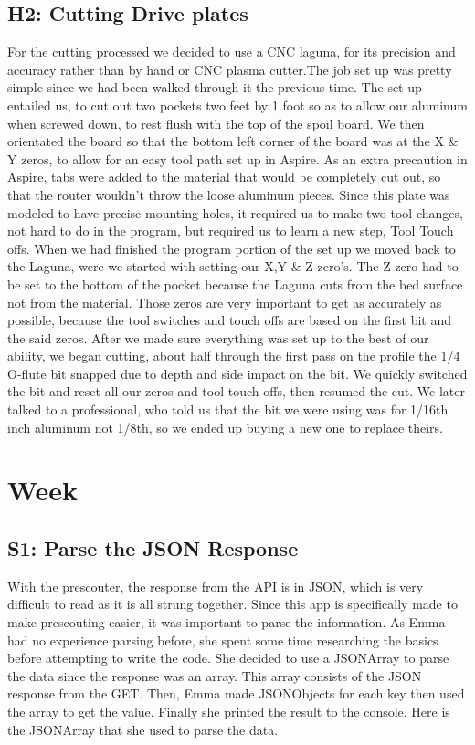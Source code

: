 \documentclass{article}
\begin{document}
\subsection{H2: Cutting Drive plates}

For the cutting processed we decided to use a CNC laguna, for its precision and accuracy rather than by hand or CNC plasma cutter.The job set up was pretty simple since we had been walked through it the previous time. The set up entailed us, to cut out two pockets two feet by 1 foot so as to allow our aluminum when screwed down, to rest flush with the top of the spoil board. We then orientated the board so that the bottom left corner of the board was at the X \& Y zeros, to allow for an easy tool path set up in Aspire. As an extra precaution in Aspire, tabs were added to the material that would be completely cut out, so that the router wouldn't throw the loose aluminum pieces. Since this plate was modeled to have precise mounting holes, it required us to make two tool changes, not hard to do in the program, but required us to learn a new step, Tool Touch offs. When we had finished the program portion of the set up we moved back to the Laguna, were we started with setting our X,Y \& Z zero's. The Z zero had to be set to the bottom of the pocket because the Laguna cuts from the bed surface not from the material. Those zeros are very important to get as accurately as possible, because the tool switches and touch offs are based on the first bit and the said zeros. After we made sure everything was set up to the best of our ability, we began cutting, about half through the first pass on the profile the 1/4 O-flute bit snapped due to depth and side impact on the bit. We quickly switched the bit and reset all our zeros and tool touch offs, then resumed the cut. We later talked to a professional, who told us that the bit we were using was for 1/16th inch aluminum not 1/8th, so we ended up buying a new one to replace theirs.  

\clearpage \newpage \section{Week \thesection} 
\subsection{S1: Parse the JSON Response}

With the prescouter, the response from the API is in JSON, which is very difficult to read as it is all strung together. Since this app is specifically made to make prescouting easier, it was important to parse the information. As Emma had no experience parsing before, she spent some time researching the basics before attempting to write the code. She decided to use a JSONArray to parse the data since the response was an array. This array consists of the JSON response from the GET. Then, Emma made JSONObjects for each key then used the array to get the value. Finally she printed the result to the console. Here is the JSONArray that she used to parse the data. 
\end{document}
